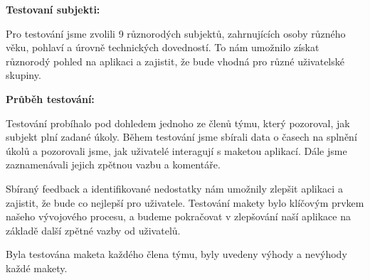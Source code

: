 \documentclass[a4paper, 11pt]{article}
\begin{document}
\textbf{Testovaní subjekti:}

Pro testování jsme zvolili 9 různorodých subjektů, zahrnujících osoby různého věku, pohlaví a úrovně technických dovedností. To nám umožnilo získat různorodý pohled na aplikaci a zajistit, že bude vhodná pro různé uživatelské skupiny.

\textbf{Průběh testování:}

Testování probíhalo pod dohledem jednoho ze členů týmu, který pozoroval, jak subjekt plní zadané úkoly. Během testování jsme sbírali data o časech na splnění úkolů a pozorovali jsme, jak uživatelé interagují s maketou aplikací. Dále jsme zaznamenávali jejich zpětnou vazbu a komentáře.

Sbíraný feedback a identifikované nedostatky nám umožnily zlepšit aplikaci a zajistit, že bude co nejlepší pro uživatele. Testování makety bylo klíčovým prvkem našeho vývojového procesu, a budeme pokračovat v zlepšování naší aplikace na základě další zpětné vazby od uživatelů.

Byla testována maketa každého člena týmu, byly uvedeny výhody a nevýhody každé makety.
\end{document}
